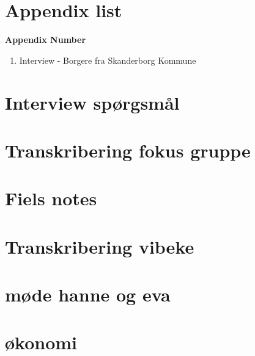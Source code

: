 \chapter{Appendix list}

\textbf{Appendix Number}
\begin{enumerate}
	\item Interview - Borgere fra Skanderborg
Kommune
\end{enumerate}



\chapter{Interview spørgsmål} \label{interviewquestion}

\chapter{Transkribering fokus gruppe}

\chapter{Fiels notes}

\chapter{Transkribering vibeke}

\chapter{møde hanne og eva}

\chapter{økonomi} \label{economics}

